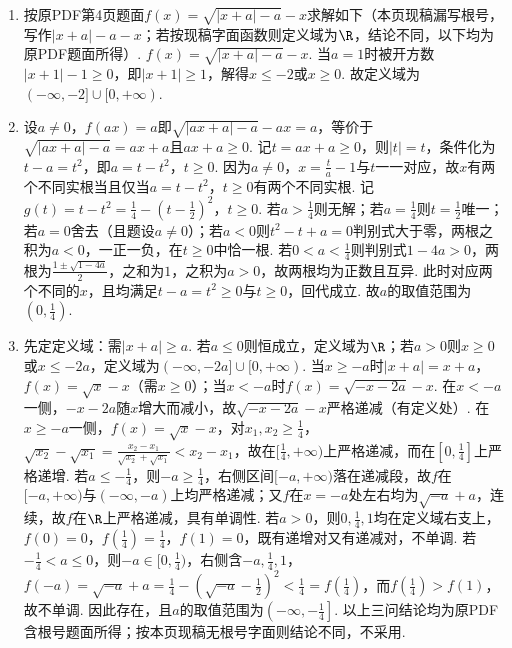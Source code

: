 \begin{solution}
\begin{enumerate}\item 按原PDF第4页题面\(f(x)=\sqrt{|x+a|-a}-x\)求解如下（本页现稿漏写根号，写作\(|x+a|-a-x\)；若按现稿字面函数则定义域为\(\R\)，结论不同，以下均为原PDF题面所得）.  \(f(x)=\sqrt{|x+a|-a}-x\). 当\(a=1\)时被开方数\(|x+1|-1\ge 0\)，即\(|x+1|\ge 1\)，解得\(x\le -2\)或\(x\ge 0\). 故定义域为\((-\infty,-2]\cup[0,+\infty)\). \item 设\(a\ne 0\)，\(f(ax)=a\)即\(\sqrt{|ax+a|-a}-ax=a\)，等价于\(\sqrt{|ax+a|-a}=ax+a\)且\(ax+a\ge 0\). 记\(t=ax+a\ge 0\)，则\(|t|=t\)，条件化为\(t-a=t^{2}\)，即\(a=t-t^{2}\)，\(t\ge 0\). 因为\(a\ne 0\)，\(x=\frac{t}{a}-1\)与\(t\)一一对应，故\(x\)有两个不同实根当且仅当\(a=t-t^{2}\)，\(t\ge 0\)有两个不同实根. 记\(g(t)=t-t^{2}=\frac{1}{4}-\left(t-\frac{1}{2}\right)^{2}\)，\(t\ge 0\). 若\(a>\frac{1}{4}\)则无解；若\(a=\frac{1}{4}\)则\(t=\frac{1}{2}\)唯一；若\(a=0\)舍去（且题设\(a\ne 0\)）；若\(a<0\)则\(t^{2}-t+a=0\)判别式大于零，两根之积为\(a<0\)，一正一负，在\(t\ge 0\)中恰一根. 若\(0<a<\frac{1}{4}\)则判别式\(1-4a>0\)，两根为\(\frac{1\pm\sqrt{1-4a}}{2}\)，之和为\(1\)，之积为\(a>0\)，故两根均为正数且互异. 此时对应两个不同的\(x\)，且均满足\(t-a=t^{2}\ge 0\)与\(t\ge 0\)，回代成立. 故\(a\)的取值范围为\(\left(0,\frac{1}{4}\right)\). \item 先定定义域：需\(|x+a|\ge a\). 若\(a\le 0\)则恒成立，定义域为\(\R\)；若\(a>0\)则\(x\ge 0\)或\(x\le -2a\)，定义域为\((-\infty,-2a]\cup[0,+\infty)\). 当\(x\ge -a\)时\(|x+a|=x+a\)，\(f(x)=\sqrt{x}-x\)（需\(x\ge 0\)）；当\(x<-a\)时\(f(x)=\sqrt{-x-2a}-x\). 在\(x<-a\)一侧，\(-x-2a\)随\(x\)增大而减小，故\(\sqrt{-x-2a}-x\)严格递减（有定义处）. 在\(x\ge -a\)一侧，\(f(x)=\sqrt{x}-x\)，对\(x_{1},x_{2}\ge \frac{1}{4}\)，\(\sqrt{x_{2}}-\sqrt{x_{1}}=\frac{x_{2}-x_{1}}{\sqrt{x_{2}}+\sqrt{x_{1}}}<x_{2}-x_{1}\)，故在\([\frac{1}{4},+\infty)\)上严格递减，而在\([0,\frac{1}{4}]\)上严格递增. 若\(a\le -\frac{1}{4}\)，则\(-a\ge \frac{1}{4}\)，右侧区间\([-a,+\infty)\)落在递减段，故\(f\)在\([-a,+\infty)\)与\((-\infty,-a)\)上均严格递减；又\(f\)在\(x=-a\)处左右均为\(\sqrt{-a}+a\)，连续，故\(f\)在\(\R\)上严格递减，具有单调性. 若\(a>0\)，则\(0,\frac{1}{4},1\)均在定义域右支上，\(f(0)=0\)，\(f\left(\frac{1}{4}\right)=\frac{1}{4}\)，\(f(1)=0\)，既有递增对又有递减对，不单调. 若\(-\frac{1}{4}<a\le 0\)，则\(-a\in[0,\frac{1}{4})\)，右侧含\(-a,\frac{1}{4},1\)，\(f(-a)=\sqrt{-a}+a=\frac{1}{4}-\left(\sqrt{-a}-\frac{1}{2}\right)^{2}<\frac{1}{4}=f\left(\frac{1}{4}\right)\)，而\(f\left(\frac{1}{4}\right)>f(1)\)，故不单调. 因此存在，且\(a\)的取值范围为\(\left(-\infty,-\frac{1}{4}\right]\). 以上三问结论均为原PDF含根号题面所得；按本页现稿无根号字面则结论不同，不采用. \end{enumerate}
\end{solution}

